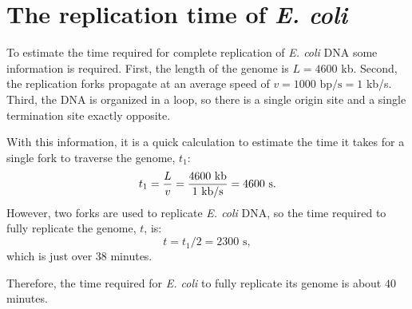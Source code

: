 \chapter{The replication time of \emph{E. coli}}
\label{ap:EColi}

To estimate the time required for complete replication of \emph{E. coli} DNA some information is required.
First, the length of the genome is $L = 4600$ kb.
Second, the replication forks propagate at an average speed of $v = 1000 \text{ bp/s} = 1$ kb/s.
Third, the DNA is organized in a loop, so there is a single origin site and a single termination site exactly opposite. \cite{EColi}

With this information, it is a quick calculation to estimate the time it takes for a single fork to traverse the genome, $t_1$:
\begin{equation}
	t_1 = {{L}\over{v}} = {{4600 \text{ kb}}\over{1 \text{ kb/s}}} = 4600 \text{ s}.
\end{equation}
However, two forks are used to replicate \emph{E. coli} DNA, so the time required to fully replicate the genome, $t$, is:
\begin{equation}
	t = t_1/2 = 2300 \text{ s},
\end{equation}
which is just over 38 minutes.

Therefore, the time required for \emph{E. coli} to fully replicate its genome is about $40$ minutes.